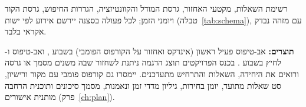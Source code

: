 רשימת השאלות, מקטעי האחזור, גרסת המודל והקוונטיזציה, הגדרות החיפוש, גרסת הקוד ויומני הזמן; לכל פעולה בסצנה יירשם אירוע לפי ישות \texttt{}
(טבלה~\ref{tab:schema}), עם מזהה נבדק אקראי בלבד.\par
\textbf{תוצרים:} אב-טיפוס פעיל ראשון (אינדקס ואחזור על הקורפוס הפומבי) בשבוע , ואב-טיפוס  ו- לחיץ בשבוע . בכנס הפרויקטים תוצג
הדגמה ניתנת לשחזור שבה משנים מסמך או גרסה ורואים את היחידה, השאלות והתרחיש מתעדכנים. יימסרו גם קורפוס פומבי עם מקור ורישיון, סט שאלות מתועד, יומן בחירות,
גיליון מדדי זמן ונאמנות, מסמך סיכונים ותוכנית הרחבה מותנית אישורים (פרק~\ref{ch:plan}).
